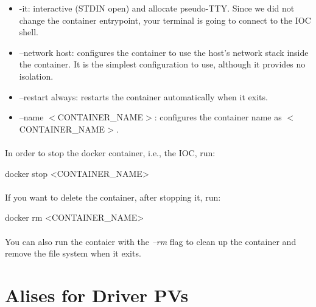 \documentclass[openany]{article}
\begin{document}
        \begin{itemize}
          \item -it: interactive (STDIN open) and allocate pseudo-TTY. Since we did not change the container entrypoint, your terminal is going to connect to the IOC shell.
          \item --network host: configures the container to use the host's network stack inside the container. It is the simplest configuration to use, although it provides no isolation.
          \item --restart always: restarts the container automatically when it exits.
          \item --name $<$CONTAINER\_NAME$>$: configures the container name as $<$CONTAINER\_NAME$>$.
        \end{itemize}

        \paragraph{} In order to stop the docker container, i.e., the IOC, run:

        \vspace{1mm}
        \begin{code}
docker stop <CONTAINER_NAME>
        \end{code}
        \vspace{1mm}

        \paragraph{} If you want to delete the container, after stopping it, run:

        \vspace{1mm}
        \begin{code}
docker rm <CONTAINER_NAME>
        \end{code}
        \vspace{1mm}

        \paragraph{} You can also run the contaier with the \emph{--rm} flag to clean up the container and remove the file system when it exits.

\section{Alises for Driver PVs}\label{sec:dev-reference-frame}
\end{document}
